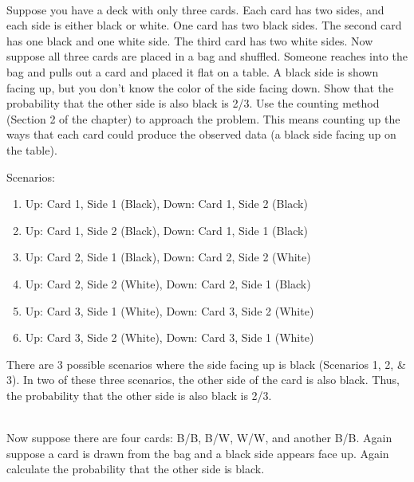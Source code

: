 \documentclass[12pt]{article}\usepackage[]{graphicx}\usepackage[]{color}
\newenvironment{problem}[2][Problem]{\begin{trivlist}
\item[\hskip \labelsep {\bfseries #1}\hskip \labelsep {\bfseries #2.}]}{\end{trivlist}}
\begin{document}
\begin{problem}{2M4}
\text{}\\
Suppose you have a deck with only three cards. Each card has two sides, and each side is either black or white. One card has two black sides. The second card has one black and one white side. The third card has two white sides. Now suppose all three cards are placed in a bag and shuffled. Someone reaches into the bag and pulls out a card and placed it flat on a table. A black side is shown facing up, but you don't know the color of the side facing down. Show that the probability that the other side is also black is 2/3. Use the counting method (Section 2 of the chapter) to approach the problem. This means counting up the ways that each card could produce the observed data (a black side facing up on the table).
\end{problem}

Scenarios:
\begin{enumerate}
  \item Up: Card 1, Side 1 (Black), Down: Card 1, Side 2 (Black)
  \item Up: Card 1, Side 2 (Black), Down: Card 1, Side 1 (Black)
  \item Up: Card 2, Side 1 (Black), Down: Card 2, Side 2 (White)
  \item Up: Card 2, Side 2 (White), Down: Card 2, Side 1 (Black)
  \item Up: Card 3, Side 1 (White), Down: Card 3, Side 2 (White)
  \item Up: Card 3, Side 2 (White), Down: Card 3, Side 1 (White)
\end{enumerate}

There are 3 possible scenarios where the side facing up is black (Scenarios 1, 2, \& 3). In two of these three scenarios, the other side of the card is also black. Thus, the probability that the other side is also black is 2/3.

\begin{problem}{2M5}
\text{}\\
Now suppose there are four cards: B/B, B/W, W/W, and another B/B. Again suppose a card is drawn from the bag and a black side appears face up. Again calculate the probability that the other side is black.
\end{problem}
\end{document}
